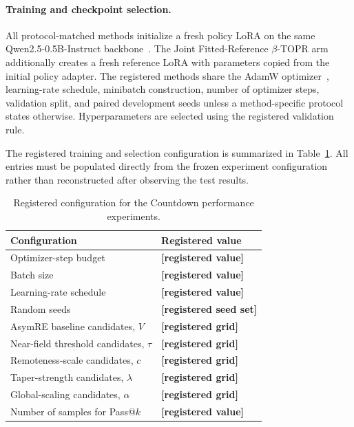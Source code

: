 \documentclass{article}
\theoremstyle{plain}
\theoremstyle{definition}
\theoremstyle{remark}
\begin{document}
\paragraph{Training and checkpoint selection.}

All protocol-matched methods initialize a fresh policy LoRA on the same
Qwen2.5-0.5B-Instruct backbone~\citep{qwen2024qwen25}. The Joint
Fitted-Reference \(\beta\)-TOPR arm additionally creates a fresh
reference LoRA with parameters copied from the initial policy adapter.
The registered methods share the AdamW
optimizer~\citep{loshchilov2019decoupled}, learning-rate schedule,
minibatch construction, number of optimizer steps, validation split,
and paired development seeds unless a method-specific protocol states
otherwise. Hyperparameters are selected using the registered validation
rule.

The registered training and selection configuration is summarized in
Table~\ref{tab:countdown_registered_config}. All entries must be
populated directly from the frozen experiment configuration rather than
reconstructed after observing the test results.

\begin{table}[t]
\centering
\caption{Registered configuration for the Countdown performance experiments.}
\label{tab:countdown_registered_config}

\small
\setlength{\tabcolsep}{8pt}
\renewcommand{\arraystretch}{1.12}

\begin{tabular}{@{}ll@{}}
\toprule
Configuration & Registered value \\
\midrule
Optimizer-step budget
& \textbf{[registered value]} \\
Batch size
& \textbf{[registered value]} \\
Learning-rate schedule
& \textbf{[registered value]} \\
Random seeds
& \textbf{[registered seed set]} \\
AsymRE baseline candidates, $V$
& \textbf{[registered grid]} \\
Near-field threshold candidates, $\tau$
& \textbf{[registered grid]} \\
Remoteness-scale candidates, $c$
& \textbf{[registered grid]} \\
Taper-strength candidates, $\lambda$
& \textbf{[registered grid]} \\
Global-scaling candidates, $\alpha$
& \textbf{[registered grid]} \\
Number of samples for Pass@$k$
& \textbf{[registered value]} \\
\bottomrule
\end{tabular}
\end{table}
\end{document}
